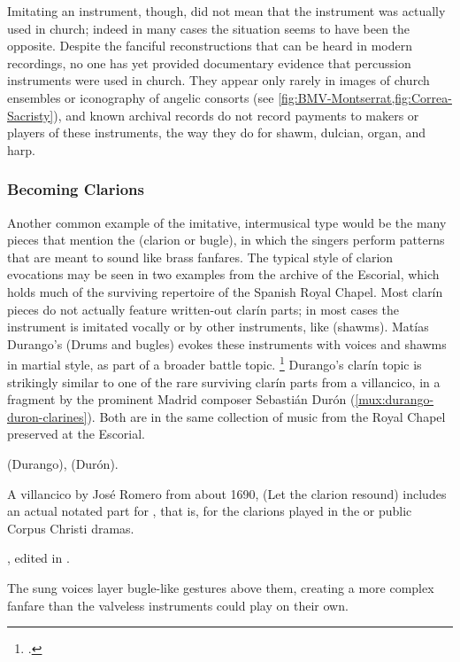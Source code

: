 Imitating an instrument, though, did not mean that the instrument was actually
used in church; indeed in many cases the situation seems to have been the
opposite.
Despite the fanciful reconstructions that can be heard in modern recordings, no
one has yet provided documentary evidence that percussion instruments were used
in church.
They appear only rarely in images of church ensembles or iconography of angelic
consorts (see \cref{fig:BMV-Montserrat,fig:Correa-Sacristy}), and known
archival records do not record payments to makers or players of these
instruments, the way they do for shawm, dulcian, organ, and harp.%
    \citXXX[evidence needed]

\subsubsection{Becoming Clarions}

Another common example of the imitative, intermusical type would be the many
pieces that mention the  (clarion or bugle), in which the
singers perform patterns that are meant to sound like brass fanfares.
The typical style of clarion evocations may be seen in two examples from the
archive of the Escorial, which holds much of the surviving repertoire of the
Spanish Royal Chapel.
Most clarín pieces do not actually feature written-out clarín parts; in most
cases the instrument is imitated vocally or by other instruments, like
 (shawms).
Matías Durango's  (Drums and bugles) evokes these
instruments with voices and shawms in martial style, as part of a broader
battle topic.%
    \footnote{.}
Durango's clarín topic is strikingly similar to one of the rare surviving
clarín parts from a villancico, in a fragment by the prominent Madrid composer
Sebastián Durón (\cref{mux:durango-duron-clarines}). 
Both are in the same collection of music from the Royal Chapel preserved at the
Escorial.%
\begin{Footnote}
     (Durango),  (Durón).
\end{Footnote}
A villancico by José Romero from about 1690,  (Let the
clarion resound) includes an actual notated part for , that is, for the clarions played in the 
or public Corpus Christi dramas.%
\begin{Footnote} 
    , edited in \autocite[655--661]{CaberoPueyo:PhD}.
\end{Footnote}
The sung voices layer bugle-like gestures above them, creating a more complex
fanfare than the valveless instruments could play on their own.

